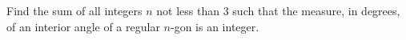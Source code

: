 Find the sum of all integers $n$ not less than $3$ such that the measure, in degrees, of an interior angle of a regular $n$-gon is an integer.
